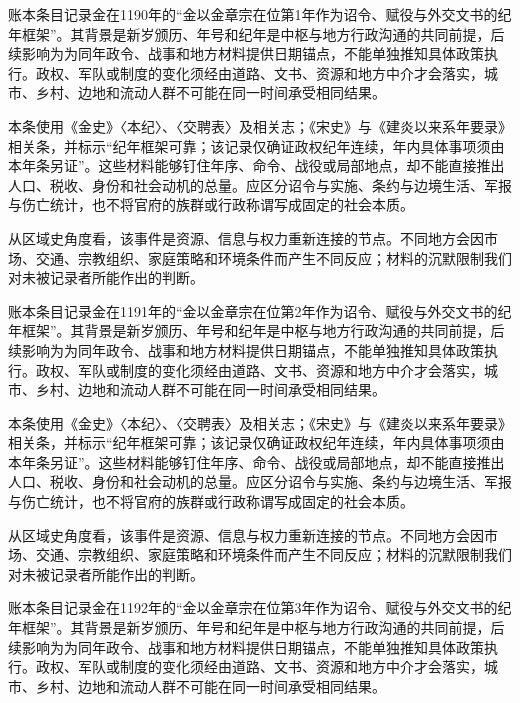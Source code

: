 账本条目记录金在1190年的“金以金章宗在位第1年作为诏令、赋役与外交文书的纪年框架”。其背景是新岁颁历、年号和纪年是中枢与地方行政沟通的共同前提，后续影响为为同年政令、战事和地方材料提供日期锚点，不能单独推知具体政策执行。政权、军队或制度的变化须经由道路、文书、资源和地方中介才会落实，城市、乡村、边地和流动人群不可能在同一时间承受相同结果。

本条使用《金史》〈本纪〉、〈交聘表〉及相关志；《宋史》与《建炎以来系年要录》相关条，并标示“纪年框架可靠；该记录仅确证政权纪年连续，年内具体事项须由本年条另证”。这些材料能够钉住年序、命令、战役或局部地点，却不能直接推出人口、税收、身份和社会动机的总量。应区分诏令与实施、条约与边境生活、军报与伤亡统计，也不将官府的族群或行政称谓写成固定的社会本质。

从区域史角度看，该事件是资源、信息与权力重新连接的节点。不同地方会因市场、交通、宗教组织、家庭策略和环境条件而产生不同反应；材料的沉默限制我们对未被记录者所能作出的判断。

账本条目记录金在1191年的“金以金章宗在位第2年作为诏令、赋役与外交文书的纪年框架”。其背景是新岁颁历、年号和纪年是中枢与地方行政沟通的共同前提，后续影响为为同年政令、战事和地方材料提供日期锚点，不能单独推知具体政策执行。政权、军队或制度的变化须经由道路、文书、资源和地方中介才会落实，城市、乡村、边地和流动人群不可能在同一时间承受相同结果。

本条使用《金史》〈本纪〉、〈交聘表〉及相关志；《宋史》与《建炎以来系年要录》相关条，并标示“纪年框架可靠；该记录仅确证政权纪年连续，年内具体事项须由本年条另证”。这些材料能够钉住年序、命令、战役或局部地点，却不能直接推出人口、税收、身份和社会动机的总量。应区分诏令与实施、条约与边境生活、军报与伤亡统计，也不将官府的族群或行政称谓写成固定的社会本质。

从区域史角度看，该事件是资源、信息与权力重新连接的节点。不同地方会因市场、交通、宗教组织、家庭策略和环境条件而产生不同反应；材料的沉默限制我们对未被记录者所能作出的判断。

账本条目记录金在1192年的“金以金章宗在位第3年作为诏令、赋役与外交文书的纪年框架”。其背景是新岁颁历、年号和纪年是中枢与地方行政沟通的共同前提，后续影响为为同年政令、战事和地方材料提供日期锚点，不能单独推知具体政策执行。政权、军队或制度的变化须经由道路、文书、资源和地方中介才会落实，城市、乡村、边地和流动人群不可能在同一时间承受相同结果。

